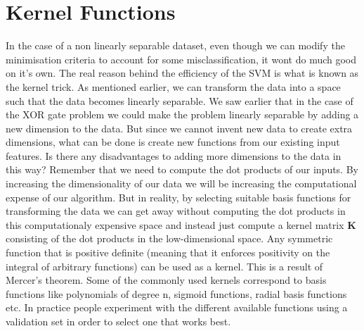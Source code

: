 \documentclass{../template/texnote}
\begin{document}
\section{Kernel Functions}
In the case of a non linearly separable dataset, even though we can modify the minimisation criteria to account for some misclassification, it wont do much good on it's own. The real reason behind the efficiency of the SVM is what is known as the kernel trick. As mentioned earlier, we can transform the data into a space such that the data becomes linearly separable. We saw earlier that in the case of the XOR gate problem we could make the problem linearly separable by adding a new dimension to the data. But since we cannot invent new data to create extra dimensions, what can be done is create new functions from our existing input features. 
Is there any disadvantages to adding more dimensions to the data in this way? Remember that we need to compute the dot products of our inputs. By increasing the dimensionality of our data we will be increasing the computational expense of our algorithm. 
But in reality, by selecting suitable basis functions for transforming the data we can get away without computing the dot products in this computationaly expensive space and instead just compute a kernel matrix \textbf{K} consisting of the dot products in the low-dimensional space. Any symmetric function that is positive definite (meaning that it enforces positivity on the integral of arbitrary functions) can be used as a kernel. This is a result of Mercer’s theorem. 
Some of the commonly used kernels correspond to basis functions like polynomials of degree n, sigmoid functions, radial basis functions etc. In practice people experiment with the different available functions using a validation set in order to select one that works best. 


    \printbibliography
\end{document}
